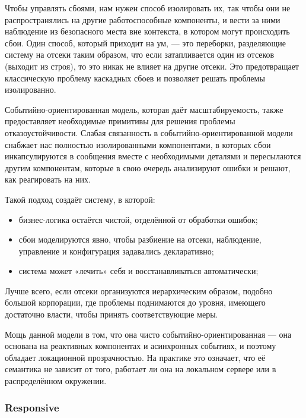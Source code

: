 Чтобы управлять сбоями, нам нужен способ изолировать их, так чтобы они не распространялись на другие работоспособные компоненты, и вести за ними наблюдение из безопасного места вне контекста, в котором могут происходить сбои. Один способ, который приходит на ум, --- это переборки, разделяющие систему на отсеки таким образом, что если затапливается один из отсеков (выходит из строя), то это никак не влияет на другие отсеки. Это предотвращает классическую проблему каскадных сбоев и позволяет решать проблемы изолированно.

Событийно-ориентированная модель, которая даёт масштабируемость, также предоставляет необходимые примитивы для решения проблемы отказоустойчивости. Слабая связанность в событийно-ориентированной модели снабжает нас полностью изолированными компонентами, в которых сбои инкапсулируются в сообщения вместе с необходимыми деталями и пересылаются другим компонентам, которые в свою очередь анализируют ошибки и решают, как реагировать на них.

Такой подход создаёт систему, в которой:

\begin{itemize}
  \item бизнес-логика остаётся чистой, отделённой от обработки ошибок;
  \item сбои моделируются явно, чтобы разбиение на отсеки, наблюдение, управление и конфигурация задавались декларативно;
  \item система может «лечить» себя и восстанавливаться автоматически;
\end{itemize}

Лучше всего, если отсеки организуются иерархическим образом, подобно большой корпорации, где проблемы поднимаются до уровня, имеющего достаточно власти, чтобы принять соответствующие меры.

Мощь данной модели в том, что она чисто событийно-ориентированная --- она основана на реактивных компонентах и асинхронных событиях, и поэтому обладает локационной прозрачностью. На практике это означает, что её семантика не зависит от того, работает ли она на локальном сервере или в распределённом окружении.

\subsubsection{Responsive}
\label{subsub:domain:reactive_programming:responsive}

